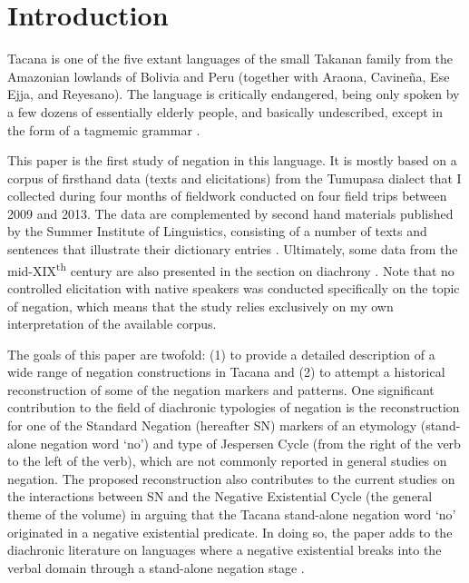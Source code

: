 \documentclass[output=paper]{langsci/langscibook}
\author{Antoine Guillaume\affiliation{Laboratoire Dynamique du Langage (CNRS \& Université Lumière de Lyon)}}
\begin{document}
\maketitle

\section{Introduction}

Tacana %
is one of the five extant languages of the small Takanan family from
the Amazonian lowlands of Bolivia and Peru (together with Araona, Cavineña, Ese Ejja, and Reyesano). The language is critically endangered, being
only spoken by a few dozens of essentially elderly people, and basically undescribed,
except in the form of a tagmemic grammar \parencites{Ottaviano1965}{Ottaviano1967}.

This paper is the first study of negation in this language. It is mostly
based on a corpus of firsthand data (texts and elicitations) from the Tumupasa
dialect that I collected during four months of fieldwork conducted on
four field trips between 2009 and 2013. The data are complemented by second
hand materials published by the Summer Institute of Linguistics, consisting
of a number of texts \citep{Ottaviano1980} and sentences that illustrate their
dictionary entries \parencites{Ottaviano1989}. Ultimately,
some data from the mid-XIX\textsuperscript{th} century are also presented
in the section on diachrony \parencites{LafoneQuevedo1902}. Note that no
controlled elicitation with native speakers was conducted specifically on
the topic of negation, which means that the study relies exclusively on my
own interpretation of the available corpus.

The goals of this paper are twofold: (1) to provide a detailed
description of a wide range of negation constructions in Tacana and
(2) to attempt a historical reconstruction of some of the negation
markers and patterns. One significant contribution to the field of
diachronic typologies of negation is the reconstruction for one of the
Standard Negation (hereafter SN) markers of an etymology (stand-alone
negation word `no') and type of Jespersen Cycle (from the right of the verb
to the left of the verb), which are not commonly reported in general
studies on negation.  The proposed reconstruction also contributes to the
current studies on the interactions between SN and the Negative Existential
Cycle (the general theme of the volume) in arguing that the Tacana
stand-alone negation word `no' originated in a negative existential
predicate. In doing so, the paper adds to the diachronic literature on
languages where a negative existential breaks into the verbal domain
through a stand-alone negation stage
\parencites[10, 13--14]{Croft1991}[127ff]{Veselinova2013}[155--156]{Veselinova2016}.
\end{document}
